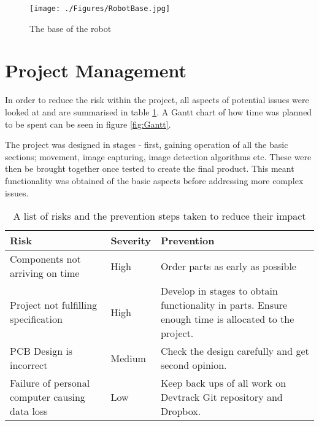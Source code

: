 \begin{figure}
\centering
\texttt{[image: ./Figures/RobotBase.jpg]}
\caption{The base of the robot}
\label{fig:RobotBase}
\end{figure}

\section{Project Management}
In order to reduce the risk within the project, all aspects of potential issues were looked at and are summarised in table \ref{tab:risk}. A Gantt chart of how time was planned to be spent can be seen in figure \ref{fig:Gantt}.  

The project was designed in stages - first, gaining operation of all the basic sections; movement, image capturing, image detection algorithms etc. These were then be brought together once tested to create the final product. This meant functionality was obtained of the basic aspects before addressing more complex issues. 
\begin{table}
\begin{tabular}{|p{6cm}|p{2cm}|p{6cm}|}\hline
Risk						&	Severity	&	Prevention \\ \hline
Components not arriving on time	&	High		&	Order parts as early as possible \\
Project not fulfilling specification				&	High		&	Develop in stages to obtain functionality in parts. Ensure enough time is allocated to the project.	\\
PCB Design is incorrect		&	Medium		&	Check the design carefully and get second opinion. \\
Failure of personal computer causing data loss & Low	& 	Keep back ups of all work on Devtrack Git repository and Dropbox.\\

\hline
\end{tabular}
\caption{A list of risks and the prevention steps taken to reduce their impact}
\label{tab:risk}
\end{table}
